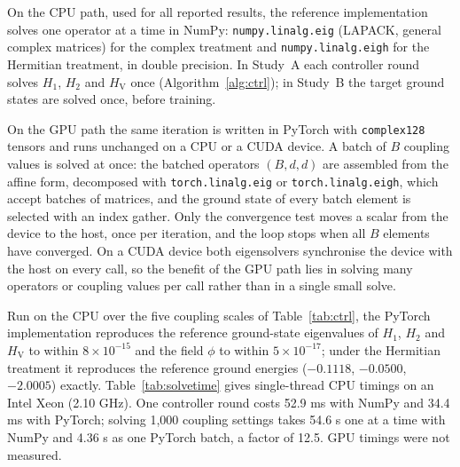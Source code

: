 \documentclass[conference]{IEEEtran}
\newcommand{\HV}{H_{\mathrm{V}}}
\begin{document}
On the CPU path, used for all reported results, the reference implementation solves one operator at a time in NumPy: \texttt{numpy.linalg.eig} (LAPACK, general complex matrices) for the complex treatment and \texttt{numpy.linalg.eigh} for the Hermitian treatment, in double precision. In Study~A each controller round solves $H_1$, $H_2$ and $\HV$ once (Algorithm~\ref{alg:ctrl}); in Study~B the target ground states are solved once, before training.

On the GPU path the same iteration is written in PyTorch with \texttt{complex128} tensors and runs unchanged on a CPU or a CUDA device. A batch of $B$ coupling values is solved at once: the batched operators $(B,d,d)$ are assembled from the affine form, decomposed with \texttt{torch.linalg.eig} or \texttt{torch.linalg.eigh}, which accept batches of matrices, and the ground state of every batch element is selected with an index gather. Only the convergence test moves a scalar from the device to the host, once per iteration, and the loop stops when all $B$ elements have converged. On a CUDA device both eigensolvers synchronise the device with the host on every call, so the benefit of the GPU path lies in solving many operators or coupling values per call rather than in a single small solve.

Run on the CPU over the five coupling scales of Table~\ref{tab:ctrl}, the PyTorch implementation reproduces the reference ground-state eigenvalues of $H_1$, $H_2$ and $\HV$ to within $8{\times}10^{-15}$ and the field $\phi$ to within $5{\times}10^{-17}$; under the Hermitian treatment it reproduces the reference ground energies ($-0.1118$, $-0.0500$, $-2.0005$) exactly. Table~\ref{tab:solvetime} gives single-thread CPU timings on an Intel Xeon (2.10 GHz). One controller round costs 52.9 ms with NumPy and 34.4 ms with PyTorch; solving 1,000 coupling settings takes 54.6 s one at a time with NumPy and 4.36 s as one PyTorch batch, a factor of 12.5. GPU timings were not measured.
\end{document}
